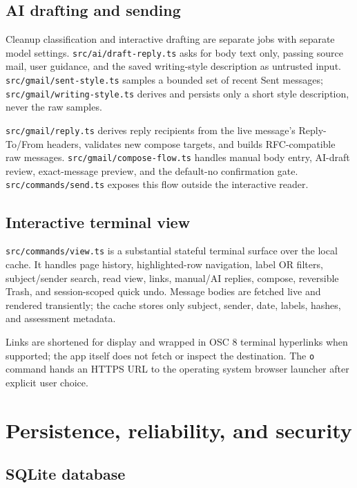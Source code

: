 \documentclass[12pt,oneside]{book}
\newcommand{\code}[1]{\nolinkurl{#1}}
\newcommand{\file}[1]{\nolinkurl{#1}}
\begin{document}
\section{AI drafting and sending}

Cleanup classification and interactive drafting are separate jobs with separate model settings. \file{src/ai/draft-reply.ts} asks for body text only, passing source mail, user guidance, and the saved writing-style description as untrusted input. \file{src/gmail/sent-style.ts} samples a bounded set of recent Sent messages; \file{src/gmail/writing-style.ts} derives and persists only a short style description, never the raw samples.

\file{src/gmail/reply.ts} derives reply recipients from the live message's Reply-To/From headers, validates new compose targets, and builds RFC-compatible raw messages. \file{src/gmail/compose-flow.ts} handles manual body entry, AI-draft review, exact-message preview, and the default-no confirmation gate. \file{src/commands/send.ts} exposes this flow outside the interactive reader.

\section{Interactive terminal view}

\file{src/commands/view.ts} is a substantial stateful terminal surface over the local cache. It handles page history, highlighted-row navigation, label OR filters, subject/sender search, read view, links, manual/AI replies, compose, reversible Trash, and session-scoped quick undo. Message bodies are fetched live and rendered transiently; the cache stores only subject, sender, date, labels, hashes, and assessment metadata.

Links are shortened for display and wrapped in OSC 8 terminal hyperlinks when supported; the app itself does not fetch or inspect the destination. The \code{o} command hands an HTTPS URL to the operating system browser launcher after explicit user choice.

\chapter{Persistence, reliability, and security}

\section{SQLite database}
\end{document}
